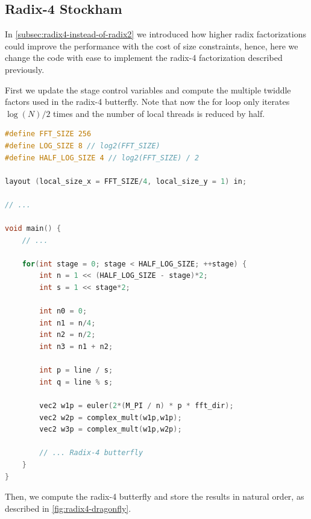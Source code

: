 \documentclass[
  oneside,
  11pt, a4paper,
  footinclude=true,
  headinclude=true,
  cleardoublepage=empty
]{scrbook}
\begin{document}
\subsection{Radix-4 Stockham} \label{subsec:radix4-stockham}

In \autoref{subsec:radix4-instead-of-radix2} we introduced how higher radix factorizations could improve the performance with the cost of size constraints, hence, here we change the code with ease to implement the radix-4 factorization described previously.
\newline

First we update the stage control variables and compute the multiple twiddle factors used in the radix-4 butterfly. Note that now the for loop only iterates $\log{(N)}/2$ times and the number of local threads is reduced by half.

\begin{lstlisting}[language=C, caption={Radix-4 Stockham stage control variables}, label={lst:radaix4-stockham-control-vars}]
#define FFT_SIZE 256
#define LOG_SIZE 8 // log2(FFT_SIZE)
#define HALF_LOG_SIZE 4 // log2(FFT_SIZE) / 2

layout (local_size_x = FFT_SIZE/4, local_size_y = 1) in;

// ...

void main() {
    // ...

    for(int stage = 0; stage < HALF_LOG_SIZE; ++stage) {
        int n = 1 << (HALF_LOG_SIZE - stage)*2;
        int s = 1 << stage*2;

        int n0 = 0;
        int n1 = n/4;
        int n2 = n/2;
        int n3 = n1 + n2;

        int p = line / s; 
        int q = line % s;

        vec2 w1p = euler(2*(M_PI / n) * p * fft_dir);
        vec2 w2p = complex_mult(w1p,w1p);
        vec2 w3p = complex_mult(w1p,w2p);

        // ... Radix-4 butterfly
    }
}
\end{lstlisting}

Then, we compute the radix-4 butterfly and store the results in natural order, as described in \autoref{fig:radix4-dragonfly}.
\newline 
\end{document}
